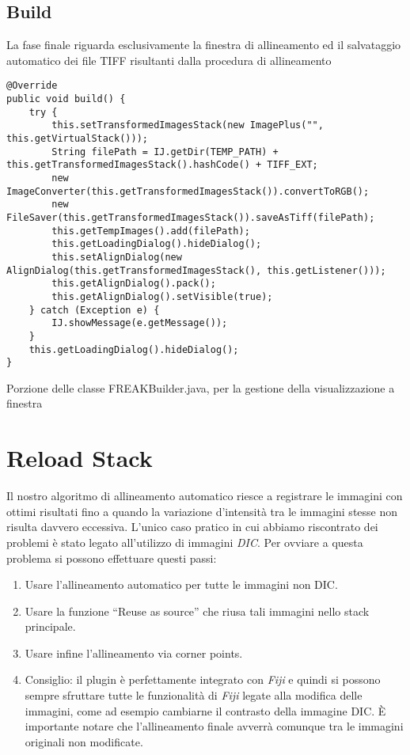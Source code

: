\subsection{Build}
\noindent La fase finale riguarda esclusivamente la finestra di allineamento ed il salvataggio automatico dei file TIFF risultanti dalla procedura di allineamento 

\begin{listing}[H]
\begin{verbatim}
@Override
public void build() {
    try {
        this.setTransformedImagesStack(new ImagePlus("", this.getVirtualStack()));
        String filePath = IJ.getDir(TEMP_PATH) + this.getTransformedImagesStack().hashCode() + TIFF_EXT;
        new ImageConverter(this.getTransformedImagesStack()).convertToRGB();
        new FileSaver(this.getTransformedImagesStack()).saveAsTiff(filePath);
        this.getTempImages().add(filePath);
        this.getLoadingDialog().hideDialog();
        this.setAlignDialog(new AlignDialog(this.getTransformedImagesStack(), this.getListener()));
        this.getAlignDialog().pack();
        this.getAlignDialog().setVisible(true);
    } catch (Exception e) {
        IJ.showMessage(e.getMessage());
    }
    this.getLoadingDialog().hideDialog();
}
\end{verbatim}
\caption{Porzione delle classe FREAKBuilder.java, per la gestione della visualizzazione a finestra}\label{lst:buildVirtualStack}
\end{listing}

\section{Reload Stack}
\noindent Il nostro algoritmo di allineamento automatico riesce a registrare le immagini con ottimi risultati fino a quando la variazione d'intensità tra le immagini stesse non risulta davvero eccessiva. L'unico caso pratico in cui abbiamo riscontrato dei problemi è stato legato all'utilizzo di immagini \textit{DIC}. Per ovviare a questa problema si possono effettuare questi passi:
\begin{enumerate}
    \item Usare l'allineamento automatico per tutte le immagini non DIC\@.
    \item Usare la funzione ``Reuse as source'' che riusa tali immagini nello stack principale.
    \item Usare infine l'allineamento via corner points.
    \item Consiglio: il plugin è perfettamente integrato con \textit{Fiji} e quindi si possono sempre sfruttare tutte le funzionalità di \textit{Fiji} legate alla modifica delle immagini, come ad esempio cambiarne il contrasto della immagine DIC. È importante notare che l'allineamento finale avverrà comunque tra le immagini originali non modificate.
\end{enumerate}